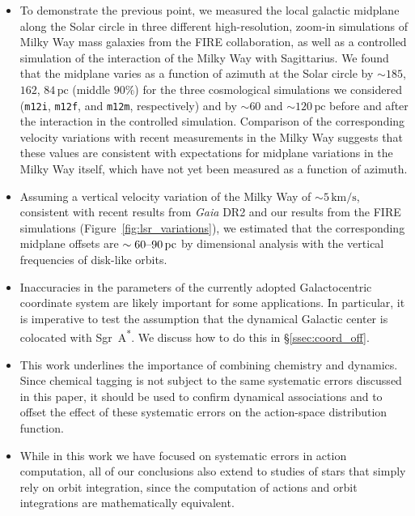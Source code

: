 \documentclass[twocolumn]{aastex62}
\newcommand{\pc}{\text{pc}}
\newcommand{\kms}{\text{km}/\text{s}}
\newcommand{\mi}{\texttt{m12i}}
\newcommand{\mf}{\texttt{m12f}}
\newcommand{\mm}{\texttt{m12m}}
\newcommand{\sgra}{Sgr~A\textsuperscript{*}}
\begin{document}
\begin{itemize}
\item To demonstrate the previous point, we measured the local galactic
midplane along the Solar circle in three different high-resolution, zoom-in
simulations of Milky Way mass galaxies from the FIRE collaboration, as well as a controlled simulation of the interaction of the Milky Way with Sagittarius. We found
that the midplane varies as a function of azimuth at the Solar circle by
$\sim185$, $162$, $84\,\pc$ (middle $90\%$) for the three cosmological simulations we considered
(\mi{}, \mf{}, and \mm{}, respectively) and by $\sim60$ and $\sim120\,\pc$ before and after the interaction in the controlled simulation. Comparison of the corresponding velocity variations with recent measurements in the Milky Way suggests that these values are consistent with expectations for midplane variations in the Milky Way itself, which have not yet been measured as a function of azimuth.

\item Assuming a vertical velocity variation of the Milky Way of
$\sim5\,\kms$, consistent with recent results from \textit{Gaia} DR2
\citep{2018A&A...616A..11G, 2019arXiv190209569F} and our results from the FIRE
simulations (Figure~\ref{fig:lsr_variations}), we estimated that the
corresponding midplane offsets are $\sim60\textup{--}90\,\pc$ by dimensional
analysis with the vertical frequencies of disk-like orbits.

\item Inaccuracies in the parameters of the currently adopted
Galactocentric coordinate system are likely important for some
applications. In particular, it is imperative to test the assumption that the
dynamical Galactic center is colocated with \sgra{}. We discuss how to
do this in \S \ref{ssec:coord_off}.

\item This work underlines the importance of combining chemistry and dynamics.
Since chemical tagging \citep{2002ARA&A..40..487F} is not subject to the same systematic errors discussed in this paper, it should be used to confirm dynamical associations and to offset the effect of these systematic errors on the action-space distribution function.

\item While in this work we have focused on systematic errors in action
computation, all of our conclusions also extend to studies of stars that
simply rely on orbit integration, since the computation of actions and orbit
integrations are mathematically equivalent.

\end{itemize}
\end{document}
